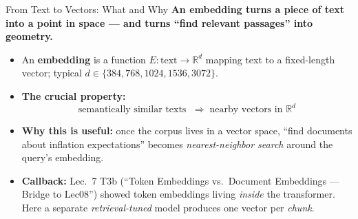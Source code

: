 \begin{frame}{From Text to Vectors: What and Why}
\textbf{An embedding turns a piece of text into a point in space --- and turns ``find relevant passages'' into geometry.}

\medskip
\begin{itemize}
\item An \textbf{embedding} is a function $E: \text{text} \to \mathbb{R}^d$ mapping text to a fixed-length vector; typical $d \in \{384, 768, 1024, 1536, 3072\}$.

\medskip
\item \textbf{The crucial property:}
\[
\text{semantically similar texts } \;\Longrightarrow\; \text{nearby vectors in } \mathbb{R}^d
\]

\medskip
\item \textbf{Why this is useful:} once the corpus lives in a vector space, ``find documents about inflation expectations'' becomes \emph{nearest-neighbor search} around the query's embedding.

\medskip
\item \textbf{Callback:} Lec.\ 7 T3b (``Token Embeddings vs.\ Document Embeddings --- Bridge to Lec08'') showed token embeddings living \emph{inside} the transformer. Here a separate \emph{retrieval-tuned} model produces one vector per \emph{chunk}.
\end{itemize}
\end{frame}


